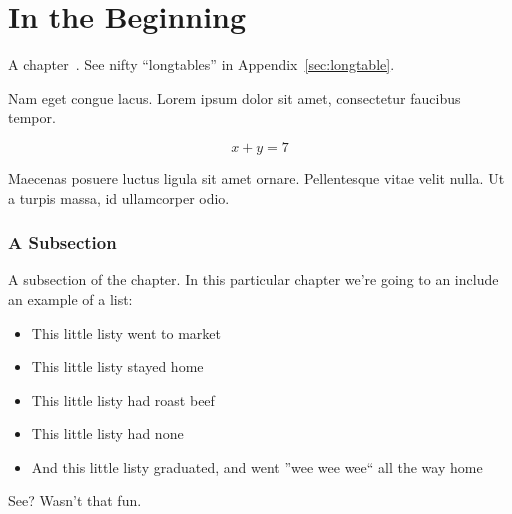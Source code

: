 







\chapter{In the Beginning}
A chapter~\cite{ref:A,ref:B,ref:C}. See nifty ``longtables'' in Appendix~\ref{sec:longtable}.

Nam eget congue lacus. Lorem ipsum dolor sit amet, consectetur faucibus tempor.

\begin{equation}
x+y=7
\end{equation}

Maecenas posuere luctus ligula sit amet ornare. Pellentesque vitae velit nulla. Ut a turpis massa, id ullamcorper odio.

\subsection{A Subsection}%
A subsection of the chapter.  In this particular chapter we're going to an include an example of a list:
\begin{itemize}
	\item This little listy went to market
	\item This little listy stayed home
	\item This little listy had roast beef
	\item This little listy had none
	\item And this little listy graduated, and went ''wee wee wee`` all the way home
\end{itemize}
See? Wasn't that fun.

